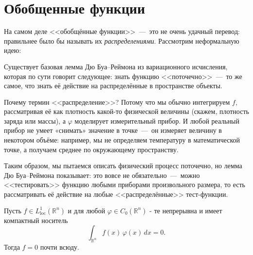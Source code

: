 \newpage
\section{Обобщенные функции}
На самом деле <<обобщённые функции>>~---~это не очень удачный перевод: правильнее было бы называть их \emph{распределениями}. Рассмотрим неформальную идею:

Существует базовая лемма Дю Буа--Реймона из вариационного исчисления, которая по сути говорит следующее: знать функцию <<поточечно>>~---~то же самое, что знать её действие на распределённые в пространстве объекты.

Почему термин <<распределение>>? Потому что мы обычно интегрируем \(f\), рассматривая её как плотность какой-то физической величины (скажем, плотность заряда или массы), а \(\varphi\) моделирует измерительный прибор. И любой реальный прибор не умеет «снимать» значение в точке~---~он измеряет величину в некотором объёме: например, мы не определяем температуру в математической точке, а получаем среднее по окружающему пространству.

Таким образом, мы пытаемся описать физический процесс поточечно, но лемма Дю Буа--Реймона показывает: это вовсе не обязательно~---~можно <<тестировать>> функцию любыми приборами произвольного размера, то есть рассматривать её действие на любые <<распределённые>> тест-функции.



\begin{lemma}
    Пусть $f\in L^1_{\mathrm{loc}}(\mathbb R^n)$ и для любой $\varphi\in C_0(\mathbb R^n)$ - те непрерывна и имеет компактный носитель
    \[
        \int_{\mathbb R^n}f(x)\,\varphi(x)\,dx=0.
    \]
    Тогда $f=0$ почти всюду.
\end{lemma}

